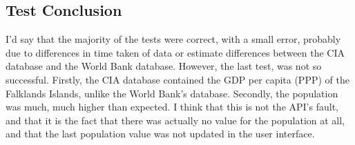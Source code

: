 \subsection{Test Conclusion}
I'd say that the majority of the tests were correct, with a small error, probably due to differences in time taken of data or estimate differences between the CIA database and the World Bank database. However, the last test, was not so successful. Firstly, the CIA database contained the GDP per capita (PPP) of the Falklands Islands, unlike the World Bank's database. Secondly, the population was much, much higher than expected. I think that this is not the API's fault, and that it is the fact that there was actually no value for the population at all, and that the last population value was not updated in the user interface.
